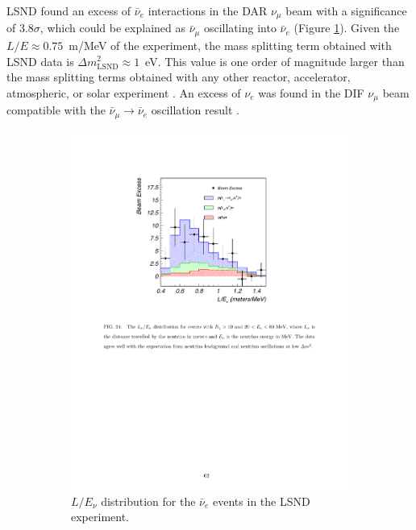 LSND found an excess of $\bar{\nu}_e$ interactions in the DAR $\nu_{\mu}$ beam with a significance of $3.8\sigma$, which could be explained as $\bar{\nu}_\mu$ oscillating into $\bar{\nu}_e$ (Figure \ref{fig:resultlsnd}). Given the $L/E\approx0.75$~m/MeV of the experiment, the mass splitting term obtained with LSND data is $\Delta m_{\mathrm{LSND}}^2\approx1$~eV. This value is one order of magnitude larger than the mass splitting terms obtained with any other reactor, accelerator, atmospheric, or solar experiment \cite{Aguilar:2001ty}. An excess of $\nu_{e}$ was found in the DIF $\nu_{\mu}$ beam compatible with the $\bar{\nu}_\mu \rightarrow \bar{\nu}_e$ oscillation result \cite{Athanassopoulos:1997pv}. 

\begin{figure}[htbp]
  \begin{subfigure}{0.45\textwidth}
    \includegraphics[height=\linewidth]{figures/lsndresult.pdf}
    \caption{$L/E_{\nu}$ distribution for the $\bar{\nu}_{e}$ events in the LSND experiment.}\label{fig:resultlsnd}
  \end{subfigure}\hfill
  \begin{subfigure}{0.45\textwidth}
    \begin{center}

\end{center}
\end{subfigure}
\end{figure}
